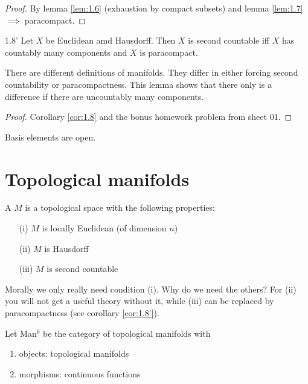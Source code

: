 \begin{proof}
    By lemma \ref{lem:1.6} (exhaustion by compact subsets) and lemma \ref{lem:1.7} \(\implies\) paracompact.
\end{proof}
\begin{customclr}{1.8'}\label{cor:1.8'}
    Let \(X\) be Euclidean amd Hausdorff. Then \(X\) is second countable iff \(X\) has countably many components and \(X\) is paracompact.
\end{customclr}
\begin{remark}
    There are different definitions of manifolds. They differ in either forcing second countability or paracompactness. This lemma shows 
    that there only is a difference if there are uncountably many components.
\end{remark}

\begin{proof}
    Corollary \ref{cor:1.8} and the bonus homework problem from sheet 01.
\end{proof}

\begin{remark}
    Basis elements are open.
\end{remark}

\section{Topological manifolds}

\begin{definition*}
    A  \(M\) is a topological space with the following properties:
    \begin{enumerate}
        \item[(i)]   \(M\) is locally Euclidean (of dimension \(n\)) 
        \item[(ii)]  \(M\) is Hausdorff
        \item[(iii)] \(M\) is second countable 
    \end{enumerate}
\end{definition*}    

Morally we only really need condition (i). Why do we need the others? 
For (ii) you will not get a useful theory without it, while (iii) can be replaced by paracompactness (see corollary \ref{cor:1.8'}).

\begin{definition*}
    Let Man$^0$ be the category of topological manifolds with 
    \begin{enumerate}
        \item objects: topological manifolds 
        \item morphisms: continuous functions  
    \end{enumerate}
\end{definition*}

